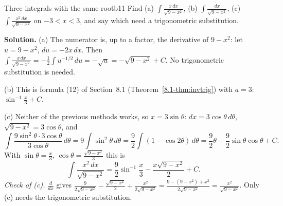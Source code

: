 \documentclass[11pt]{article}
\begin{document}
\begin{exmp}{Three integrals with the same root}{b11}
Find (a) $\int\frac{x\,dx}{\sqrt{9-x^2}}$, (b) $\int\frac{dx}{\sqrt{9-x^2}}$, (c) $\int\frac{x^2\,dx}{\sqrt{9-x^2}}$ on $-3<x<3$, and say which need a trigonometric substitution.

\textbf{Solution.} (a) The numerator is, up to a factor, the derivative of $9-x^2$: let $u=9-x^2$, $du=-2x\,dx$. Then $\int\frac{x\,dx}{\sqrt{9-x^2}}=-\frac12\int u^{-1/2}\,du=-\sqrt u=-\sqrt{9-x^2}+C$. No trigonometric substitution is needed.

(b) This is formula (12) of Section~8.1 (Theorem~\ref{8.1-thm:invtrig}) with $a=3$: $\sin^{-1}\frac x3+C$.

(c) Neither of the previous methods works, so $x=3\sin\theta$: $dx=3\cos\theta\,d\theta$, $\sqrt{9-x^2}=3\cos\theta$, and
\[\int\frac{9\sin^2\theta\cdot3\cos\theta}{3\cos\theta}\,d\theta=9\int\sin^2\theta\,d\theta=\frac92\int(1-\cos2\theta)\,d\theta=\frac92\theta-\frac92\sin\theta\cos\theta+C .\]
With $\sin\theta=\frac x3$, $\cos\theta=\frac{\sqrt{9-x^2}}3$ this is
\[\int\frac{x^2\,dx}{\sqrt{9-x^2}}=\frac92\sin^{-1}\frac x3-\frac{x\sqrt{9-x^2}}2+C .\]
\emph{Check of (c).} $\frac{d}{dx}$ gives $\frac9{2\sqrt{9-x^2}}-\frac{\sqrt{9-x^2}}2+\frac{x^2}{2\sqrt{9-x^2}}=\frac{9-(9-x^2)+x^2}{2\sqrt{9-x^2}}=\frac{x^2}{\sqrt{9-x^2}}$. Only (c) needs the trigonometric substitution.
\end{exmp}
\end{document}
